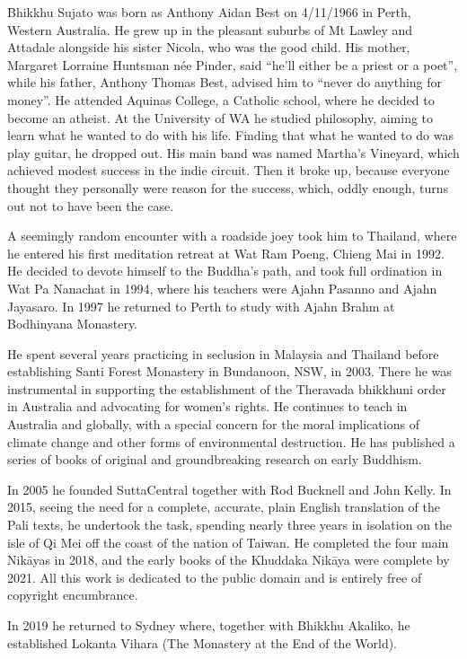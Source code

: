 \documentclass[12pt,openany]{book}%
\begin{document}
Bhikkhu Sujato was born as Anthony Aidan Best on 4/11/1966 in Perth, Western Australia. He grew up in the pleasant suburbs of Mt Lawley and Attadale alongside his sister Nicola, who was the good child. His mother, Margaret Lorraine Huntsman née Pinder, said “he’ll either be a priest or a poet”, while his father, Anthony Thomas Best, advised him to “never do anything for money”. He attended Aquinas College, a Catholic school, where he decided to become an atheist. At the University of WA he studied philosophy, aiming to learn what he wanted to do with his life. Finding that what he wanted to do was play guitar, he dropped out. His main band was named Martha’s Vineyard, which achieved modest success in the indie circuit. Then it broke up, because everyone thought they personally were reason for the success, which, oddly enough, turns out not to have been the case. 

A seemingly random encounter with a roadside joey took him to Thailand, where he entered his first meditation retreat at Wat Ram Poeng, Chieng Mai in 1992. He decided to devote himself to the Buddha’s path, and took full ordination in Wat Pa Nanachat in 1994, where his teachers were Ajahn Pasanno and Ajahn Jayasaro. In 1997 he returned to Perth to study with Ajahn Brahm at Bodhinyana Monastery. 

He spent several years practicing in seclusion in Malaysia and Thailand before establishing Santi Forest Monastery in Bundanoon, NSW, in 2003. There he was instrumental in supporting the establishment of the Theravada bhikkhuni order in Australia and advocating for women’s rights. He continues to teach in Australia and globally, with a special concern for the moral implications of climate change and other forms of environmental destruction. He has published a series of books of original and groundbreaking research on early Buddhism. 

In 2005 he founded SuttaCentral together with Rod Bucknell and John Kelly. In 2015, seeing the need for a complete, accurate, plain English translation of the Pali texts, he undertook the task, spending nearly three years in isolation on the isle of Qi Mei off the coast of the nation of Taiwan. He completed the four main \textsanskrit{Nikāyas} in 2018, and the early books of the Khuddaka \textsanskrit{Nikāya} were complete by 2021. All this work is dedicated to the public domain and is entirely free of copyright encumbrance. 

In 2019 he returned to Sydney where, together with Bhikkhu Akaliko, he established Lokanta Vihara (The Monastery at the End of the World). 
\end{document}
